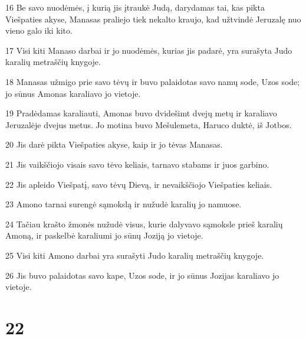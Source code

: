 \par 16 Be savo nuodėmės, į kurią jis įtraukė Judą, darydamas tai, kas pikta Viešpaties akyse, Manasas praliejo tiek nekalto kraujo, kad užtvindė Jeruzalę nuo vieno galo iki kito. 
\par 17 Visi kiti Manaso darbai ir jo nuodėmės, kurias jis padarė, yra surašyta Judo karalių metraščių knygoje. 
\par 18 Manasas užmigo prie savo tėvų ir buvo palaidotas savo namų sode, Uzos sode; jo sūnus Amonas karaliavo jo vietoje. 
\par 19 Pradėdamas karaliauti, Amonas buvo dvidešimt dvejų metų ir karaliavo Jeruzalėje dvejus metus. Jo motina buvo Mešulemeta, Haruco duktė, iš Jotbos. 
\par 20 Jis darė pikta Viešpaties akyse, kaip ir jo tėvas Manasas. 
\par 21 Jis vaikščiojo visais savo tėvo keliais, tarnavo stabams ir juos garbino. 
\par 22 Jis apleido Viešpatį, savo tėvų Dievą, ir nevaikščiojo Viešpaties keliais. 
\par 23 Amono tarnai surengė sąmokslą ir nužudė karalių jo namuose. 
\par 24 Tačiau krašto žmonės nužudė visus, kurie dalyvavo sąmoksle prieš karalių Amoną, ir paskelbė karaliumi jo sūnų Joziją jo vietoje. 
\par 25 Visi kiti Amono darbai yra surašyti Judo karalių metraščių knygoje. 
\par 26 Jis buvo palaidotas savo kape, Uzos sode, ir jo sūnus Jozijas karaliavo jo vietoje.



\chapter{22}

